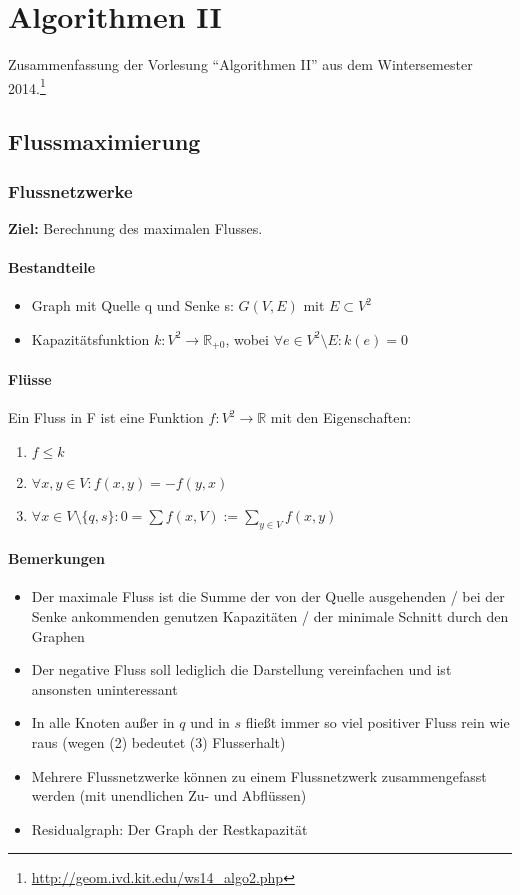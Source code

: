 \chapter{Algorithmen II}

Zusammenfassung der Vorlesung "`Algorithmen II"' aus dem Wintersemester 2014.\footnote{\url{http://geom.ivd.kit.edu/ws14_algo2.php}}


\section{Flussmaximierung}

\subsection{Flussnetzwerke}
\textbf{Ziel:} Berechnung des maximalen Flusses.

\subsubsection{Bestandteile}
\begin{itemize}
	\item Graph mit Quelle q und Senke s: \(G(V,E)\) mit \(E \subset V^2\)
	\item Kapazitätsfunktion \(k : V^2 \rightarrow \mathbb{R}_{+0}\), wobei \(\forall e \in V^2 \setminus E: k(e) = 0\)
\end{itemize}

\subsubsection{Flüsse}
Ein Fluss in F ist eine Funktion \(f:V^2\rightarrow\mathbb{R}\) mit den Eigenschaften:
\begin{enumerate}
	\item \(f \leq k\)
	\item \(\forall x,y \in V : f(x,y) = -f(y,x)\)
	\item \(\forall x \in V \setminus \{ q,s \}: 0 = \sum f(x,V) := \sum_{y\in V} f(x,y)\)
\end{enumerate}

\subsubsection{Bemerkungen}
\begin{itemize}
	\item Der maximale Fluss ist die Summe der von der Quelle ausgehenden / bei der Senke ankommenden genutzen Kapazitäten / der minimale Schnitt durch den Graphen
	\item Der negative Fluss soll lediglich die Darstellung vereinfachen und ist ansonsten uninteressant
	\item In alle Knoten außer in \(q\) und in \(s\) fließt immer so viel positiver Fluss rein wie raus (wegen (2) bedeutet (3) Flusserhalt)
	\item Mehrere Flussnetzwerke können zu einem Flussnetzwerk zusammengefasst werden (mit unendlichen Zu- und Abflüssen)
	\item Residualgraph: Der Graph der Restkapazität
\end{itemize}


